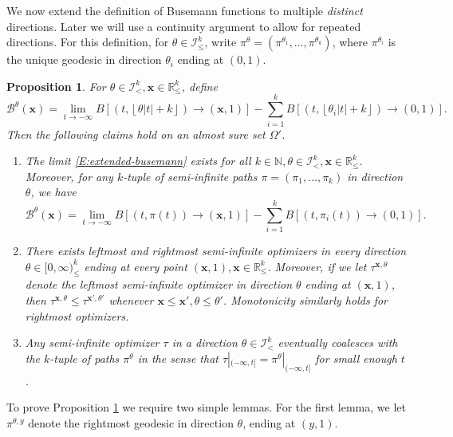 \documentclass[11pt]{article}
\newcommand{\N}{\mathbb{N}}
\newcommand{\R}{\mathbb{R}}
\newcommand{\fl}[1]{{\left\lfloor #1 \right\rfloor}}
\newcommand{\Om}{\Omega}
\newcommand{\cB}{\mathcal{B}}
\newcommand{\cI}{\mathcal{I}}
\newcommand{\bx}{\mathbf{x}}
\newtheorem{proposition}[theorem]{Proposition}
\theoremstyle{definition} %
\theoremstyle{remark} %
\begin{document}
We now extend the definition of Busemann functions to multiple \textit{distinct} directions. Later we will use a continuity argument to allow for repeated directions. For this definition, for $\theta \in \cI^k_\le$, write $\pi^{\theta} = (\pi^{\theta_1}, \dots, \pi^{\theta_k})$, where $\pi^{\theta_i}$ is the unique geodesic in direction $\theta_i$ ending at $(0, 1)$.

\begin{proposition}
	\label{P:extended-usemann}
	For $\theta \in \cI^k_<, \bx \in \R^k_\le$, define
	\begin{equation}
		\label{E:extended-busemann}
		\cB^\theta(\bx) = \lim_{t \to -\infty}  B[(t, \fl{\theta |t| + k}) \to (\bx, 1)] -  \sum_{i=1}^k B[(t, \fl{\theta_i |t| + k}) \to (0, 1)].
	\end{equation}
	Then the following claims hold on an almost sure set $\Om'$.
	\begin{enumerate}
		\item The limit \eqref{E:extended-busemann} exists for all $k \in \N, \theta \in \cI^k_<, \bx \in \R^k_\le$. Moreover, for any $k$-tuple of semi-infinite paths $\pi = (\pi_1, \dots, \pi_k)$ in direction $\theta$, we have
		\begin{equation}
			\label{E:B-t-la}
			\cB^\theta(\bx) = \lim_{t \to -\infty} B[(t, \pi(t)) \to (\bx, 1)] -  \sum_{i=1}^k B[(t, \pi_i(t)) \to (0, 1)].
		\end{equation}
		\item There exists leftmost and rightmost semi-infinite optimizers in every direction $\theta\in [0, \infty)^k_\le$ ending at every point $(\bx, 1), \bx \in \R^k_\le$. Moreover, if we let $\tau^{\bx, \theta}$ denote the leftmost semi-infinite optimizer in direction $\theta$ ending at $(\bx, 1)$, then $\tau^{\bx, \theta} \le \tau^{\bx', \theta'}$ whenever $\bx \le \bx', \theta \le \theta'$. Monotonicity similarly holds for rightmost optimizers.
\item Any semi-infinite optimizer $\tau$ in a direction $\theta\in \cI^k_<$ eventually coalesces with the $k$-tuple of paths $\pi^\theta$ in the sense that $\tau|_{(-\infty, t]} = \pi^\theta|_{(-\infty, t]}$ for small enough $t$.
	\end{enumerate}
\end{proposition}

To prove Proposition \ref{P:extended-usemann} we require two simple lemmas. For the first lemma, we let $\pi^{\theta, y}$ denote the rightmost geodesic in direction $\theta$, ending at $(y, 1)$.
\end{document}
